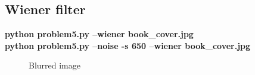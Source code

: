 \pagebreak
\subsection{Wiener filter}
\begin{minipage}{\textwidth}
\textbf{python problem5.py --wiener book\_cover.jpg} \\
\textbf{python problem5.py --noise -s 650 --wiener book\_cover.jpg}
\end{minipage}

\begin{figure}[!htb]\centering
    \begin{minipage}{0.45\textwidth}
        \caption{\small{Blurred image}}
    \end{minipage}
    \begin{minipage}{0.45\textwidth}

\end{minipage}
\end{figure}
